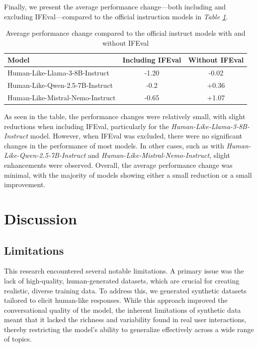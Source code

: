 \documentclass{article}
\begin{document}
Finally, we present the average performance change—both including and excluding IFEval—compared to the official instruction models in \textit{Table \ref{table:performance_percent}}.

\begin{table}[h!]
\centering
\begin{tabular}{lcc}
\toprule
\textbf{Model} &  \textbf{Including IFEval} & \textbf{Without IFEval} \\
\midrule
Human-Like-Llama-3-8B-Instruct & -1.20  & -0.02 \\
Human-Like-Qwen-2.5-7B-Instruct & -0.2 & +0.36 \\
Human-Like-Mistral-Nemo-Instruct & -0.65 & +1.07  \\
\bottomrule
\end{tabular}
\vspace{0.3cm}
\caption{Average performance change compared to the official instruct models with and without IFEval}
\label{table:performance_percent}
\end{table}

As seen in the table, the performance changes were relatively small, with slight reductions when including IFEval, particularly for the \textit{Human-Like-Llama-3-8B-Instruct} model. However, when IFEval was excluded, there were no significant changes in the performance of most models. In other cases, such as with \textit{Human-Like-Qwen-2.5-7B-Instruct} and \textit{Human-Like-Mistral-Nemo-Instruct}, slight enhancements were observed. Overall, the average performance change was minimal, with the majority of models showing either a small reduction or a small improvement.

\section{Discussion}

\subsection{Limitations}
\label{sec:limitations}

This research encountered several notable limitations. A primary issue was the lack of high-quality, human-generated datasets, which are crucial for creating realistic, diverse training data. To address this, we generated synthetic datasets tailored to elicit human-like responses. While this approach improved the conversational quality of the model, the inherent limitations of synthetic data meant that it lacked the richness and variability found in real user interactions, thereby restricting the model's ability to generalize effectively across a wide range of topics.
\end{document}

